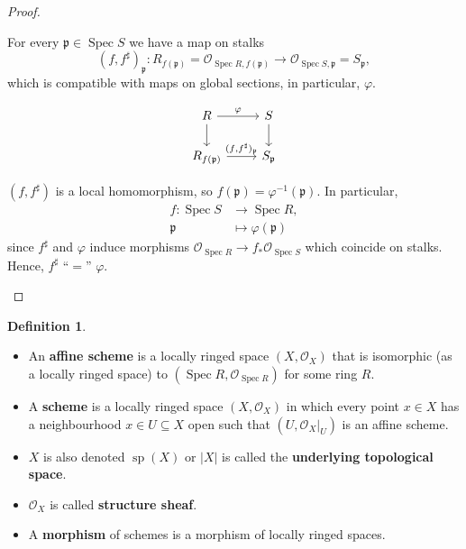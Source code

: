 \documentclass[12pt]{article}
\DeclareMathOperator{\Spec}{Spec}
\DeclareMathOperator{\spa}{sp}
\theoremstyle{definition}
\newtheorem*{definition}{Definition}
\theoremstyle{remark}
\begin{document}
\begin{proof}
\begin{enumerate}
For every $\mathfrak{p}\in\Spec S$ we have a map on stalks
\[(f,f^{\sharp})_{\mathfrak{p}}:R_{f(\mathfrak{p})}=\mathcal{O}_{\Spec R,f(\mathfrak{p})}\longrightarrow\mathcal{O}_{\Spec S,\mathfrak{p}}=S_{\mathfrak{p}},\]
which is compatible with maps on global sections, in particular, $\varphi$.

\[
\begin{tikzcd}
R\arrow[r,"\varphi"]\arrow[d]&S\arrow[d]\\
R_{f(\mathfrak{p})}\arrow[r,"(f{,}f^{\sharp})_{\mathfrak{p}}"]&S_{\mathfrak{p}}
\end{tikzcd}
\]

$(f,f^{\sharp})$ is a local homomorphism, so $f(\mathfrak{p})=\varphi^{-1}(\mathfrak{p})$. In particular,
\begin{align*}
f:\Spec S&\longrightarrow\Spec R,\\
\mathfrak{p}&\longmapsto\varphi(\mathfrak{p})
\end{align*}
since $f^{\sharp}$ and $\varphi$ induce morphisms $\mathcal{O}_{\Spec R}\rightarrow f_*\mathcal{O}_{\Spec S}$ which coincide on stalks. Hence, $f^{\sharp}$ ``$=$'' $\varphi$.
\end{enumerate}
\end{proof}

\begin{definition}
\begin{itemize}
\item An \textbf{affine scheme} is a locally ringed space $(X,\mathcal{O}_X)$ that is isomorphic (as a locally ringed space) to $(\Spec R,\mathcal{O}_{\Spec R})$ for some ring $R$.

\item A \textbf{scheme} is a locally ringed space $(X,\mathcal{O}_X)$ in which every point $x\in X$ has a neighbourhood $x\in U\subseteq X$ open such that $(U,\mathcal{O}_X|_U)$ is an affine scheme.

\item $X$ is also denoted $\spa(X)$ or $|X|$ is called the \textbf{underlying topological space}.

\item $\mathcal{O}_X$ is called \textbf{structure sheaf}.

\item A \textbf{morphism} of schemes is a morphism of locally ringed spaces.
\end{itemize}
\end{definition}
\end{document}
